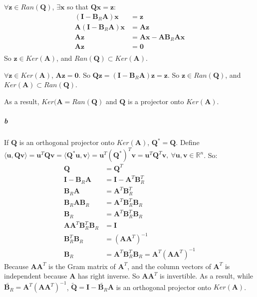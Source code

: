 \documentclass[22pt]{article}
\begin{document}
		$\forall \mathbf{z} \in Ran(\mathbf{Q})$, $\exists \mathbf{x}$ so that $\mathbf{Qx=z}$:
		\begin{align}
			(\mathbf{I} - \mathbf{B}_R\mathbf{A})\mathbf{x} & = \mathbf{z} \\
			\mathbf{A}(\mathbf{I} - \mathbf{B}_R\mathbf{A})\mathbf{x} & = \mathbf{Az} \\
			\mathbf{Az} & = \mathbf{Ax} - \mathbf{AB}_R\mathbf{Ax}\\
			\mathbf{Az} & = \mathbf{0}\\
		\end{align}
		So $\mathbf{z} \in Ker(\mathbf{A})$, and $Ran(\mathbf{Q}) \subset Ker(\mathbf{A})$.

		$\forall \mathbf{z} \in Ker(\mathbf{A})$, $\mathbf{Az=0}$. So $\mathbf{Qz} = (\mathbf{I} - \mathbf{B}_R\mathbf{A})\mathbf{z} = \mathbf{z}$. So $\mathbf{z} \in Ran(\mathbf{Q})$, and $Ker(\mathbf{A} )\subset Ran(\mathbf{Q})$.

		As a result, $Ker(\mathbf{A} = Ran(\mathbf{Q})$ and $\mathbf{Q}$ is a projector onto $Ker(\mathbf{A})$.

		\subparagraph{b} If $\mathbf{Q}$ is an orthogonal projector onto $Ker(\mathbf{A})$, $\mathbf{Q}^* = \mathbf{Q}$. Define $\langle \mathbf{u},\mathbf{Q}\mathbf{v} \rangle = \mathbf{u}^T\mathbf{Q}\mathbf{v}  = \langle  \mathbf{Q}^*\mathbf{u},\mathbf{v} \rangle = \mathbf{u}^T(\mathbf{Q}^*)^T\mathbf{v} = \mathbf{u}^T\mathbf{Q}^T\mathbf{v},\ \forall \mathbf{u,v} \in \mathbb{R}^n$. So:
		\begin{align}
			\mathbf{Q} & = \mathbf{Q}^T\\
			\mathbf{I} - \mathbf{B}_R\mathbf{A} & = \mathbf{I} - \mathbf{A}^T\mathbf{B}_R^T\\
			\mathbf{B}_R\mathbf{A} & = \mathbf{A}^T\mathbf{B}_R^T\\
			\mathbf{B}_R\mathbf{A}\mathbf{B}_R & = \mathbf{A}^T\mathbf{B}_R^T\mathbf{B}_R\\
			\mathbf{B}_R & = \mathbf{A}^T\mathbf{B}_R^T\mathbf{B}_R\\
			\mathbf{A}\mathbf{A}^T\mathbf{B}_R^T\mathbf{B}_R & = \mathbf{I}\\
			\mathbf{B}_R^T\mathbf{B}_R & = (\mathbf{A}\mathbf{A}^T)^{-1}\\
			\mathbf{B}_R & = \mathbf{A}^T\mathbf{B}_R^T\mathbf{B}_R = \mathbf{A}^T(\mathbf{A}\mathbf{A}^T)^{-1}
		\end{align}
		Because $\mathbf{A}\mathbf{A}^T$ is the Gram matrix of $\mathbf{A}^T$, and the column vectors of $\mathbf{A}^T$ is independent because $\mathbf{A}$ has right inverse. So $\mathbf{A}\mathbf{A}^T$ is invertible. As a result, while $ \widetilde{\mathbf{B}_R}  = \mathbf{A}^T(\mathbf{A}\mathbf{A}^T)^{-1}$, $\widetilde{\mathbf{Q}} = \mathbf{I} - \widetilde{\mathbf{B}_R}\mathbf{A} $  is an orthogonal projector onto $Ker(\mathbf{A})$.
 
\end{document}

